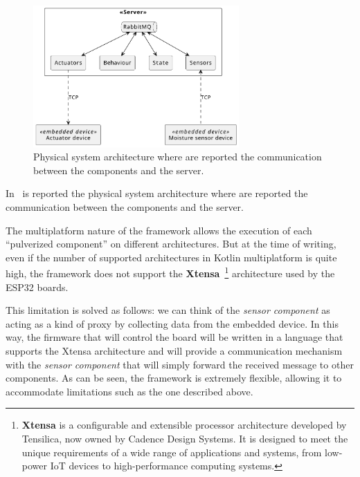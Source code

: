\begin{figure}[ht]
	\centering
	\includegraphics[width=0.7\textwidth]{figures/demo1-physical.pdf}
	\caption[Physical system architecture demo 1]{Physical system architecture where are reported the communication between the components and the server.}
	\label{fig:demo-1-physical-system}
\end{figure}

In~ is reported the physical system architecture where are reported the communication between the components and the
server.

The multiplatform nature of the framework allows the execution of each ``pulverized component'' on different architectures.
But at the time of writing, even if the number of supported architectures in Kotlin multiplatform is quite high, the framework does not support the
\textbf{Xtensa}~\footnote{\textbf{Xtensa} is a configurable and extensible processor architecture developed by Tensilica, now owned by Cadence Design Systems. It is designed to meet the unique requirements of a wide range of applications and systems, from low-power IoT devices to high-performance computing systems.}
architecture used by the ESP32 boards.

This limitation is solved as follows: we can think of the \emph{sensor component} as acting as a kind of proxy by collecting data from
the embedded device. In this way, the firmware that will control the board will be written in a language that supports the Xtensa architecture and
will provide a communication mechanism with the \emph{sensor component} that will simply forward the received message to other components.
As can be seen, the framework is extremely flexible, allowing it to accommodate limitations such as the one described above.

